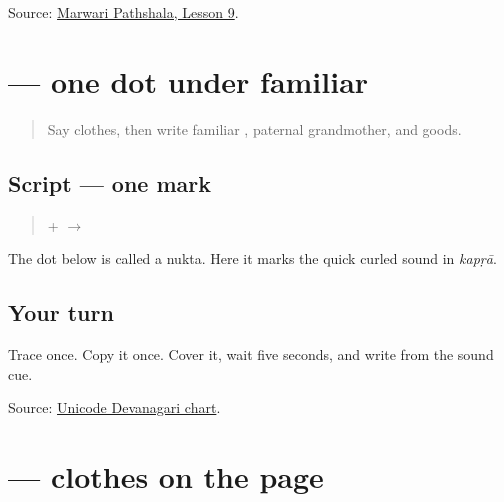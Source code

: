 \begin{tcolorbox}[breakable,colback=teal!4,colframe=teal!35!black,title={Before you move on}]
Source: \href{https://www.marwaripathshala.com/marwari-lesson-9-english}{Marwari Pathshala, Lesson 9}.
\end{tcolorbox}
\section[\texorpdfstring{\mw{़} (nukta)}{़ (nukta)}]{ — one dot under familiar }

\label{lesson:MW-W15-nukta}



\begin{quote}
Say clothes, then write familiar \textbf{}, paternal grandmother, and goods.
\end{quote}

\subsection*{Script — one mark}

\begin{quote}
\textbf{} + \textbf{} $\to$ \textbf{}
\end{quote}

The dot below is called a nukta. Here it marks the quick curled sound in \emph{kapṛā}.

\subsection*{Your turn}
Trace \textbf{} once. Copy it once. Cover it, wait five seconds, and write \textbf{} from the sound cue.

\begin{tcolorbox}[breakable,colback=teal!4,colframe=teal!35!black,title={Before you move on}]
Source: \href{https://www.unicode.org/charts/PDF/U0900.pdf}{Unicode Devanagari chart}.
\end{tcolorbox}
\section[\texorpdfstring{\mw{कपड़ा} (kapṛā)}{कपड़ा (kapṛā)}]{ — clothes on the page}

\label{lesson:MW-C15-kapda}



